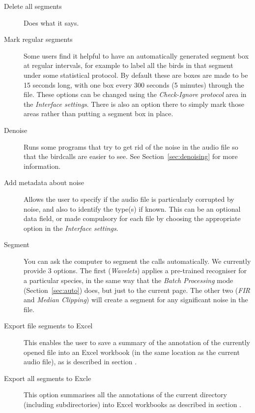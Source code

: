 \documentclass{scrartcl}
\begin{document}
\begin{description}
\item [Delete all segments] Does what it says. 
\item [Mark regular segments] Some users find it helpful to have an automatically generated segment box at regular intervals, for example to label all the birds in that segment under some statistical protocol. By default these are boxes are made to be 15 seconds long, with one box every 300 seconds (5 minutes) through the file. These options can be changed using the \textit{Check-Ignore protocol} area in the \textit{Interface settings}. There is also an option there to simply mark those areas rather than putting a segment box in place.
\item [Denoise] Runs some programs that try to get rid of the noise in the audio file so that the birdcalls are easier to see. %
See Section~\ref{sec:denoising} for more information.
\item [Add metadata about noise] Allows the user to specify if the audio file is particularly corrupted by noise, and also to identify the type(s) if known. This can be an optional data field, or made compulsory for each file by choosing the appropriate option in the \textit{Interface settings}.
\item [Segment] You can ask the computer to segment the calls automatically. We currently provide 3 options. The first (\textit{Wavelets}) applies a pre-trained recogniser for a particular species, in the same way that the \textit{Batch Processing} mode (Section~\ref{sec:auto}) does, but just to the current page. The other two (\textit{FIR} and \textit{Median Clipping}) will create a segment for any significant noise in the file. 
\item [Export file segments to Excel] This enables the user to save a summary of the annotation of the currently opened file into an Excel workbook (in the same location as the current audio file), as is described in section . 
\item[Export all segments to Excle] This option summarises all the annotations of the current directory (including subdirectories) into Excel workbooks as described in section .

\end{description}
\end{document}
